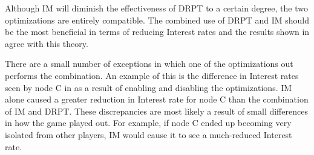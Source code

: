 Although IM will diminish the effectiveness of DRPT to a certain degree, the two optimizations are entirely compatible. The combined use of DRPT and IM should be the most beneficial in terms of reducing Interest rates and the results shown in  agree with this theory. 

There are a small number of exceptions in which one of the optimizations out performs the combination. An example of this is the difference in Interest rates seen by node C in  as a result of enabling and disabling the optimizations. IM alone caused a greater reduction in Interest rate for node C than the combination of IM and DRPT. These discrepancies are most likely a result of small differences in how the game played out. For example, if node C ended up becoming very isolated from other players, IM would cause it to see a much-reduced Interest rate. 

